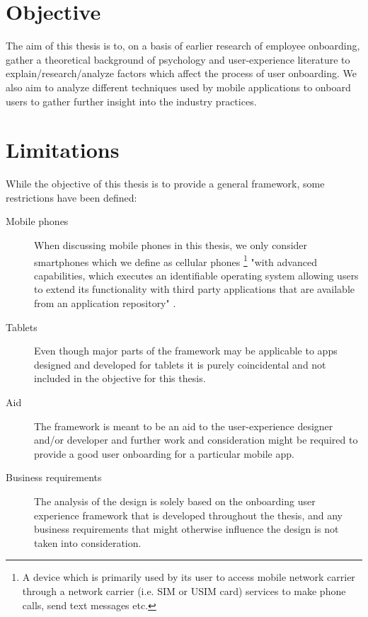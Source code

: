 \section{Objective}
The aim of this thesis is to, on a basis of earlier research of employee onboarding, gather a theoretical background of psychology and user-experience literature to explain/research/analyze factors which affect the process of user onboarding. We also aim to analyze different techniques used by mobile applications to onboard users to gather further insight into the industry practices.

\section{Limitations}
While the objective of this thesis is to provide a general framework, some restrictions have been defined:
\begin{description}
  \item[Mobile phones] When discussing mobile phones in this thesis, we only consider smartphones which we define as cellular phones \footnote{A device which is primarily used by its user to access mobile network carrier through a network carrier (i.e. SIM or USIM card) services to make phone calls, send text messages etc.} "with advanced capabilities, which executes an identifiable operating system allowing users to extend its functionality with third party applications that are available from an application repository" \cite{Theoharidou2012}.
  \item[Tablets] Even though major parts of the framework may be applicable to apps designed and developed for tablets it is purely coincidental and not included in the objective for this thesis.
  \item[Aid] The framework is meant to be an aid to the user-experience designer and/or developer and further work and consideration might be required to provide a good user onboarding for a particular mobile app.
  \item[Business requirements] The analysis of the design is solely based on the onboarding user experience framework that is developed throughout the thesis, and any business requirements that might otherwise influence the design is not taken into consideration.
\end{description}

